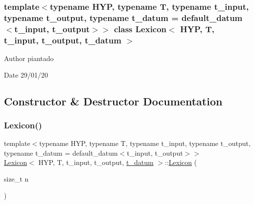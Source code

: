\subsubsection*{template$<$typename H\+YP, typename T, typename t\+\_\+input, typename t\+\_\+output, typename t\+\_\+datum = default\+\_\+datum$<$t\+\_\+input, t\+\_\+output$>$$>$\newline
class Lexicon$<$ H\+Y\+P, T, t\+\_\+input, t\+\_\+output, t\+\_\+datum $>$}

\begin{DoxyAuthor}{Author}
piantado 
\end{DoxyAuthor}
\begin{DoxyDate}{Date}
29/01/20 
\end{DoxyDate}


\subsection{Constructor \& Destructor Documentation}
\mbox{\label{class_lexicon_a8dde249de3f884484ff14de62a2c6df2}} 
\subsubsection{\texorpdfstring{Lexicon()}{Lexicon()}\hspace{0.1cm}{\footnotesize\ttfamily [1/2]}}
{\footnotesize\ttfamily template$<$typename H\+YP, typename T, typename t\+\_\+input, typename t\+\_\+output, typename t\+\_\+datum = default\+\_\+datum$<$t\+\_\+input, t\+\_\+output$>$$>$ \\
\hyperlink{class_lexicon}{Lexicon}$<$ H\+YP, T, t\+\_\+input, t\+\_\+output, \hyperlink{class_bayesable_a7c93a2eeab708378eb321745908718d4}{t\+\_\+datum} $>$\+::\hyperlink{class_lexicon}{Lexicon} (\begin{DoxyParamCaption}\item[{size\+\_\+t}]{n }\end{DoxyParamCaption})\hspace{0.3cm}{\ttfamily [inline]}}

\mbox{\label{class_lexicon_a1b81e27f60f3e1cb7c0b376ac66aff45}} 
